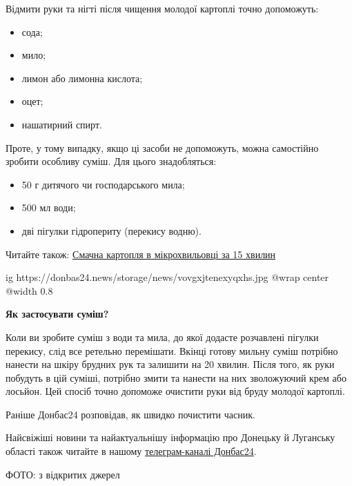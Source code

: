 Відмити руки та нігті після чищення молодої картоплі точно допоможуть:

\begin{itemize}
  \item сода;
  \item мило;
  \item лимон або лимонна кислота;
  \item оцет;
  \item нашатирний спирт.
\end{itemize}

Проте, у тому випадку, якщо ці засоби не допоможуть, можна самостійно зробити
особливу суміш. Для цього знадобляться:

\begin{itemize}
  \item 50 г дитячого чи господарського мила;
  \item 500 мл води;
  \item дві пігулки гідропериту (перекису водню).
\end{itemize}

Читайте також: \href{https://donbas24.news/news/smacna-kartoplya-v-mikroxvilyovci-za-15-xvilin}{Смачна картопля в мікрохвильовці за 15 хвилин}

\ifcmt
  ig https://donbas24.news/storage/news/vovgxjtenexyqxhs.jpg
  @wrap center
  @width 0.8
\fi

\textbf{Як застосувати суміш?}

Коли ви зробите суміш з води та мила, до якої додасте розчавлені пігулки
перекису, слід все ретельно перемішати. Вкінці готову мильну суміш потрібно
нанести на шкіру брудних рук та залишити на 20 хвилин. Після того, як руки
побудуть в цій суміші, потрібно змити та нанести на них зволожуючий крем або
лосьйон. Цей спосіб точно допоможе очистити руки від бруду молодої картоплі.

Раніше Донбас24 розповідав, як швидко почистити часник.

Найсвіжіші новини та найактуальнішу інформацію про Донецьку й Луганську області
також читайте в нашому \href{https://t.me/donbas24/}{телеграм-каналі Донбас24}.

ФОТО: з відкритих джерел
